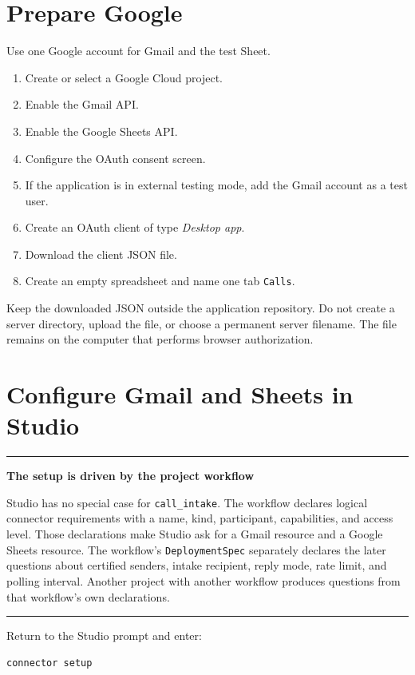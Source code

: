 \documentclass[11pt,a4paper]{article}
\newenvironment{notebox}[1]
{\begin{center}\begin{minipage}{0.94\linewidth}
 \color{ZipperInk}\hrule\vspace{5pt}\textbf{#1}\par\smallskip}
{\vspace{5pt}\hrule\end{minipage}\end{center}}
\begin{document}
\section{Prepare Google}

Use one Google account for Gmail and the test Sheet.

\begin{enumerate}
  \item Create or select a Google Cloud project.
  \item Enable the Gmail API.
  \item Enable the Google Sheets API.
  \item Configure the OAuth consent screen.
  \item If the application is in external testing mode, add the Gmail account
        as a test user.
  \item Create an OAuth client of type \emph{Desktop app}.
  \item Download the client JSON file.
  \item Create an empty spreadsheet and name one tab \texttt{Calls}.
\end{enumerate}

Keep the downloaded JSON outside the application repository. Do not create a
server directory, upload the file, or choose a permanent server filename.
The file remains on the computer that performs browser authorization.

\section{Configure Gmail and Sheets in Studio}
\label{sec:oauth}

\begin{notebox}{The setup is driven by the project workflow}
Studio has no special case for \texttt{call\_intake}. The workflow declares
logical connector requirements with a name, kind, participant, capabilities,
and access level. Those declarations make Studio ask for a Gmail resource and
a Google Sheets resource. The workflow's \texttt{DeploymentSpec} separately
declares the later questions about certified senders, intake recipient, reply
mode, rate limit, and polling interval. Another project with another workflow
produces questions from that workflow's own declarations.
\end{notebox}

Return to the Studio prompt and enter:

\begin{lstlisting}[style=shell]
connector setup
\end{lstlisting}
\end{document}
